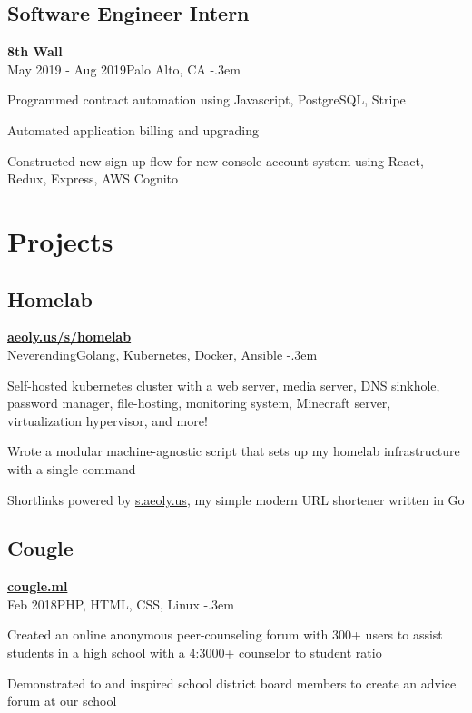 \documentclass{article}
\let\olditemize=\itemize \let\endolditemize=\enditemize
\renewenvironment{itemize}{\olditemize[topsep=0em] \itemsep-.3em}{\endolditemize}
\newcommand{\link}[1]{\href{https://#1}{#1}}
\newcommand{\entry}[3]{\quad\textbf{#1}\\#2\qquad#3}
\begin{document}
\subsection{Software Engineer Intern}
\entry{8th Wall}{May 2019 - Aug 2019}{Palo Alto, CA}
\begin{itemize}
  \item Programmed contract automation using Javascript, PostgreSQL, Stripe
  \item Automated application billing and upgrading
  \item Constructed new sign up flow for new console account system using
    React, Redux, Express, AWS Cognito
\end{itemize}


\section{Projects}

\subsection{Homelab}
\entry{\link{aeoly.us/s/homelab}}
  {Neverending}{Golang, Kubernetes, Docker, Ansible}
\begin{itemize}
  \item Self-hosted kubernetes cluster with a web server, media server, DNS
    sinkhole, password manager, file-hosting, monitoring system, Minecraft
    server, virtualization hypervisor, and more!
  \item Wrote a modular machine-agnostic script that sets up my homelab
    infrastructure with a single command
  \item Shortlinks powered by \link{s.aeoly.us}, my simple modern URL shortener
    written in Go
\end{itemize}

\subsection{Cougle}
\entry{\link{cougle.ml}}{Feb 2018}{PHP, HTML, CSS, Linux}
\begin{itemize}
  \item Created an online anonymous peer-counseling forum with 300+ users to
    assist students in a high school with a 4:3000+ counselor to student ratio
  \item Demonstrated to and inspired school district board members to create an
    advice forum at our school
\end{itemize}
\end{document}
